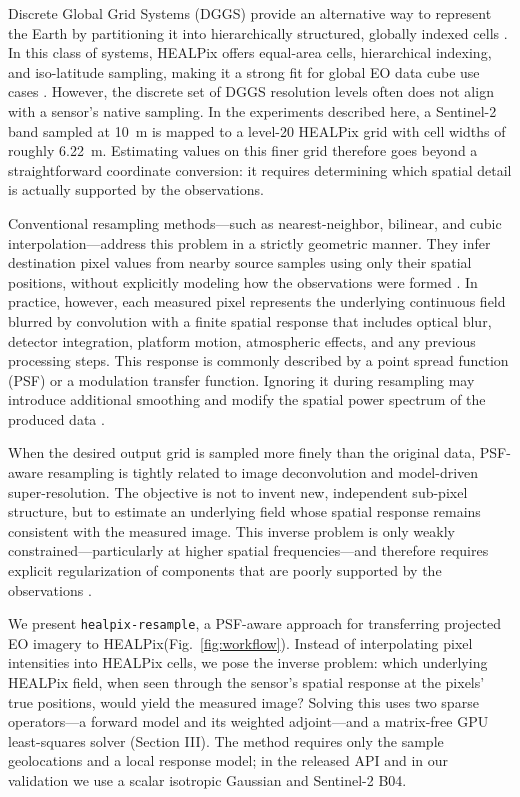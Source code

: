 \documentclass[journal]{IEEEtran}
\newcommand{\healpix}{HEALPix\xspace}
\newcommand{\psf}{PSF\xspace}
\begin{document}
Discrete Global Grid Systems (DGGS) provide an alternative way to represent the Earth by partitioning it into hierarchically structured, globally indexed cells \cite{ogc_dggs_2021,Kmoch2022}. In this class of systems, \healpix offers equal-area cells, hierarchical indexing, and iso-latitude sampling, making it a strong fit for global EO data cube use cases \cite{gorski2005healpix}. However, the discrete set of DGGS resolution levels often does not align with a sensor’s native sampling. In the experiments described here, a Sentinel-2 band sampled at 10~m is mapped to a level-20 \healpix grid with cell widths of roughly 6.22~m. Estimating values on this finer grid therefore goes beyond a straightforward coordinate conversion: it requires determining which spatial detail is actually supported by the observations.

Conventional resampling methods—such as nearest-neighbor, bilinear, and cubic interpolation—address this problem in a strictly geometric manner. They infer destination pixel values from nearby source samples using only their spatial positions, without explicitly modeling how the observations were formed \cite{esa_snap_resampling,gdal_resampling,schowengerdt_resampling}. In practice, however, each measured pixel represents the underlying continuous field blurred by convolution with a finite spatial response that includes optical blur, detector integration, platform motion, atmospheric effects, and any previous processing steps. This response is commonly described by a point spread function (\psf) or a modulation transfer function. Ignoring it during resampling may introduce additional smoothing and modify the spatial power spectrum of the produced data \cite{inamdar2023sr2,schowengerdt2007remote,kaur2024spatial}.

When the desired output grid is sampled more finely than the original data, PSF-aware resampling is tightly related to image deconvolution and model-driven super-resolution. The objective is not to invent new, independent sub-pixel structure, but to estimate an underlying field whose spatial response remains consistent with the measured image. This inverse problem is only weakly constrained—particularly at higher spatial frequencies—and therefore requires explicit regularization of components that are poorly supported by the observations \cite{richardson1972bayesian,lucy1974iterative,elad1997restoration,park2003superresolution,farsiu2004advances}.

We present \texttt{healpix-resample}, a \psf-aware approach for transferring projected EO imagery to \healpix (Fig.~\ref{fig:workflow}). Instead of interpolating pixel intensities into HEALPix cells, we pose the inverse problem: which underlying HEALPix field, when seen through the sensor’s spatial response at the pixels’ true positions, would yield the measured image? Solving this uses two sparse operators—a forward model and its weighted adjoint—and a matrix-free GPU least-squares solver (Section III). The method requires only the sample geolocations and a local response model; in the released API and in our validation we use a scalar isotropic Gaussian and Sentinel-2 B04.
\end{document}
